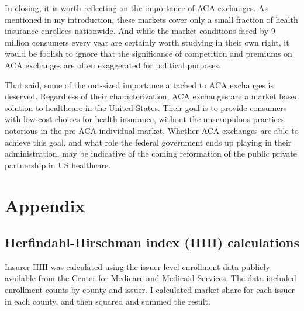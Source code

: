 \documentclass[12pt,letterpaper]{article}
\begin{document}
In closing, it is worth reflecting on the importance of ACA exchanges. As mentioned in my introduction, these markets cover only a small fraction of health insurance enrollees nationwide. And while the market conditions faced by 9 million consumers every year are certainly worth studying in their own right, it would be foolish to ignore that the significance of competition and premiums on ACA exchanges are often exaggerated for political purposes.

That said, some of the out-sized importance attached to ACA exchanges is deserved. Regardless of their characterization, ACA exchanges are a market based solution to healthcare in the United States. Their goal is to provide consumers with low cost choices for health insurance, without the unscrupulous practices notorious in the pre-ACA individual market. Whether ACA exchanges are able to achieve this goal, and what role the federal government ends up playing in their administration, may be indicative of the coming reformation of the public private partnership in US healthcare.

\pagebreak

  


\pagebreak

\appendix
{}
\section{Appendix}
\subsection{Herfindahl-Hirschman index (HHI) calculations}
Insurer HHI was calculated using the issuer-level enrollment data publicly available from the Center for Medicare and Medicaid Services. The data included enrollment counts by county and issuer. I calculated market share for each issuer in each county, and then squared and summed the result.
\end{document}
